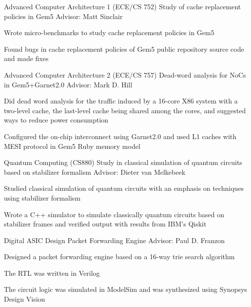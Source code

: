 \begin{cventries}
  \cventry
    {Advanced Computer Architecture 1 (ECE/CS 752)} %
    {Study of cache replacement policies in Gem5} %
    {Advisor: Matt Sinclair} %
    {} %
    {
      \begin{cvitems} %
        \item {Wrote micro-benchmarks to study cache replacement policies in Gem5}
        \item{Found bugs in cache replacement policies of Gem5 public repository source code and made fixes}
      \end{cvitems}
    }

  \cventry
    {Advanced Computer Architecture 2 (ECE/CS 757)}
    {Dead-word analysis for NoCs in Gem5+Garnet2.0}
    {Advisor: Mark D. Hill}
    {}
    {
     \begin{cvitems} %
        \item {Did dead word analysis for the traffic induced by a 16-core X86 system with a two-level cache, the last-level cache being shared among the cores, and suggested ways to reduce power consumption}
        \item{Configured the on-chip interconnect using Garnet2.0 and used L1 caches with MESI protocol in Gem5 Ruby memory model}
      \end{cvitems}
    }
    
  \cventry
    {Quantum Computing (CS880)}
    {Study in classical simulation of quantum circuits based on stabilizer formalism}
    {Advisor: Dieter van Melkebeek}
    {}
    {
     \begin{cvitems} %
        \item {Studied classical simulation of quantum circuits with an emphasis on techniques using stabilizer formalism}
        \item{Wrote a C++ simulator to simulate classically quantum circuits based on stabilizer frames and verified output with results from IBM's Qiskit}
      \end{cvitems}
    }
    
  \cventry
    {Digital ASIC Design}
    {Packet Forwarding Engine}
    {Advisor: Paul D. Franzon}
    {}
    {
     \begin{cvitems} %
        \item {Designed a packet forwarding engine based on a 16-way trie search algorithm}
        \item {The RTL was written in Verilog}
        \item {The circuit logic was simulated in ModelSim and was synthesized using Synopsys Design Vision}
      \end{cvitems}
    }


\end{cventries}
